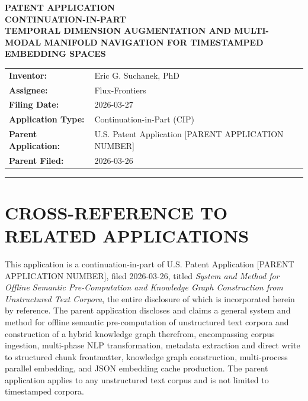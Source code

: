 \documentclass[12pt,letterpaper]{article}
\newcommand{\parentapp}{U.S. Patent Application [PARENT APPLICATION NUMBER]}
\newcommand{\parenttitle}{\emph{System and Method for Offline Semantic
Pre-Computation and Knowledge Graph Construction from Unstructured Text Corpora}}
\begin{document}

\begin{center}
  {\LARGE\bfseries PATENT APPLICATION}\\[0.5em]
  {\Large\bfseries CONTINUATION-IN-PART}\\[1.5em]
  {\large\bfseries TEMPORAL DIMENSION AUGMENTATION AND MULTI-MODAL MANIFOLD
  NAVIGATION FOR TIMESTAMPED EMBEDDING SPACES}\\[2em]
  \begin{tabular}{ll}
    \textbf{Inventor:}        & Eric G. Suchanek, PhD \\
    \textbf{Assignee:}        & Flux-Frontiers \\
    \textbf{Filing Date:}     & 2026-03-27 \\
    \textbf{Application Type:} & Continuation-in-Part (CIP) \\
    \textbf{Parent Application:} & \parentapp \\
    \textbf{Parent Filed:}    & 2026-03-26 \\
  \end{tabular}
\end{center}

\vspace{1em}
\hrule
\vspace{2em}

\tableofcontents

\newpage

\section*{CROSS-REFERENCE TO RELATED APPLICATIONS}

This application is a continuation-in-part of \parentapp, filed 2026-03-26,
titled \parenttitle, the entire disclosure of which is incorporated herein by
reference. The parent application discloses and claims a general system and
method for offline semantic pre-computation of unstructured text corpora and
construction of a hybrid knowledge graph therefrom, encompassing corpus
ingestion, multi-phase NLP transformation, metadata extraction and direct write
to structured chunk frontmatter, knowledge graph construction, multi-process
parallel embedding, and JSON embedding cache production. The parent application
applies to any unstructured text corpus and is not limited to timestamped
corpora.
\end{document}
